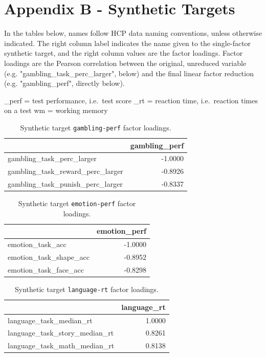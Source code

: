 \documentclass{article}
\begin{document}
\section{Appendix B - Synthetic Targets} \label{sec:appendix-b}


In the tables below, names follow HCP data naming conventions, unless otherwise
indicated. The right column label indicates the name given to the single-factor
synthetic target, and the right column values are the factor loadings. Factor
loadings are the Pearson correlation between the original, unreduced variable
(e.g. "gambling\_task\_perc\_larger", below) and the final linear factor reduction
(e.g. "gambling\_perf", directly below).

\_perf = test performance, i.e.\ test score
\_rt = reaction time, i.e.\ reaction times on a test
wm = working memory

\begin{table}[H]
\centering
\begin{tabular}{lr}
\toprule
 & gambling\_perf \\
\midrule
gambling\_task\_perc\_larger & -1.0000 \\
gambling\_task\_reward\_perc\_larger & -0.8926 \\
gambling\_task\_punish\_perc\_larger & -0.8337 \\
\bottomrule
\end{tabular}

\footnotesize
\caption{Synthetic target \texttt{gambling-perf} factor loadings.}\label{tab:gambling-perf}
\normalsize
\end{table}


\begin{table}[H]
\centering
\begin{tabular}{lr}
\toprule
 & emotion\_perf \\
\midrule
emotion\_task\_acc & -1.0000 \\
emotion\_task\_shape\_acc & -0.8952 \\
emotion\_task\_face\_acc & -0.8298 \\
\bottomrule
\end{tabular}

\footnotesize
\caption{Synthetic target \texttt{emotion-perf} factor loadings.}
\normalsize
\label{tab:emotion-perf}
\end{table}


\begin{table}[H]
\centering
\begin{tabular}{lr}
\toprule
 & language\_rt \\
\midrule
language\_task\_median\_rt & 1.0000 \\
language\_task\_story\_median\_rt & 0.8261 \\
language\_task\_math\_median\_rt & 0.8138 \\
\bottomrule
\end{tabular}

\footnotesize
\caption{Synthetic target \texttt{language-rt} factor loadings.}
\normalsize
\label{tab:language-rt}
\end{table}
\end{document}
